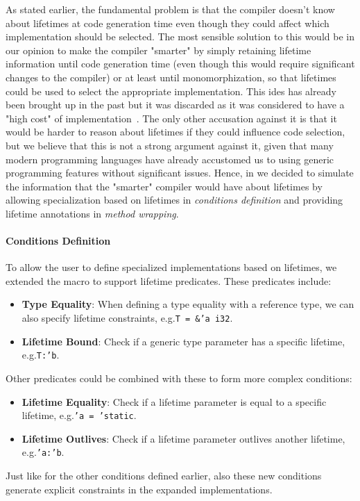 As stated earlier, the fundamental problem is that the compiler doesn't know about lifetimes at code generation time even though they could affect which implementation should be selected.
The most sensible solution to this would be in our opinion to make the compiler "smarter" by simply retaining lifetime information until code generation time (even though this would require significant changes to the compiler) or at least until monomorphization, so that lifetimes could be used to select the appropriate implementation.
This ides has already been brought up in the past but it was discarded as it was considered to have a "high cost" of implementation~\cite{SpecializationSoundness}.
The only other accusation against it is that it would be harder to reason about lifetimes if they could influence code selection, but we believe that this is not a strong argument against it, given that many modern programming languages have already accustomed us to using generic programming features without significant issues.
Hence, in \mytool{} we decided to simulate the information that the "smarter" compiler would have about lifetimes by allowing specialization based on lifetimes in \textit{conditions definition} and providing lifetime annotations in \textit{method wrapping}.

\paragraph{Conditions Definition}
To allow the user to define specialized implementations based on lifetimes, we extended the  macro to support lifetime predicates.
These predicates include:
\begin{itemize}
	\item \textbf{Type Equality}: When defining a type equality with a reference type, we can also specify lifetime constraints, e.g.\@ \mbox{\texttt{T = \&'a i32}}.
	\item \textbf{Lifetime Bound}: Check if a generic type parameter has a specific lifetime, e.g.\@ \mbox{\texttt{T:\@ 'b}}.
\end{itemize}
Other predicates could be combined with these to form more complex conditions:
\begin{itemize}
	\item \textbf{Lifetime Equality}: Check if a lifetime parameter is equal to a specific lifetime, e.g.\@ \mbox{\texttt{'a = 'static}}.
	\item \textbf{Lifetime Outlives}: Check if a lifetime parameter outlives another lifetime, e.g.\@ \mbox{\texttt{'a:\@ 'b}}.
\end{itemize}
Just like for the other conditions defined earlier, also these new conditions generate explicit constraints in the expanded implementations.

